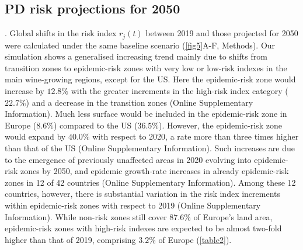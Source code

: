     \subsection{PD risk projections for 2050}. Global shifts in the risk
    index
$r_j(t)$ between 2019 and those projected for 2050 were calculated under the
    same baseline scenario (\cref{fig5}A-F, Methods). Our simulation shows a
    generalised increasing trend mainly due to shifts from transition zones to
    epidemic-risk zones with very low or low-risk indexes in the main
    wine-growing
    regions, except for the US. Here the epidemic-risk zone would increase by
$12.8\%$ with the greater increments in the high-risk index category ($22.7\%$)
    and a decrease in the transition zones (Online Supplementary Information).
    Much
    less surface
    would be included in the epidemic-risk zone in Europe ($8.6\%$) compared to
    the
    US ($36.5\%$). However, the epidemic-risk zone would expand by $40.0\%$
    with
    respect to 2020, a rate more than three times higher than that of the US
    (Online Supplementary Information). Such increases are due to the emergence
    of
    previously
    unaffected areas in 2020 evolving into epidemic-risk zones by 2050, and
    epidemic growth-rate increases in already epidemic-risk zones in 12 of 42
    countries (Online Supplementary Information). Among these 12 countries,
    however,
    there is
    substantial variation in the risk index increments within epidemic-risk
    zones
    with respect to 2019 (Online Supplementary Information). While non-risk
    zones
    still cover
$87.6\%$ of Europe's land area, epidemic-risk zones with high-risk indexes are
    expected to be almost two-fold higher than that of 2019, comprising $3.2\%$
    of
    Europe (\cref{table2}). \\

